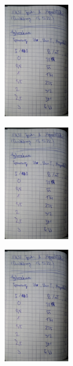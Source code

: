 \begin{minipage}[t]{0.4\textwidth}
    \includegraphics[height=5cm, page=5]{scans_messdaten/v308_Hysteresekurve.pdf}
\end{minipage}

\begin{minipage}[t]{0.4\textwidth}
    \includegraphics[height=5cm, page=6]{scans_messdaten/v308_Hysteresekurve.pdf}
\end{minipage}
\begin{minipage}[t]{0.4\textwidth}
    \includegraphics[height=5cm, page=7]{scans_messdaten/v308_Hysteresekurve.pdf}
\end{minipage}

